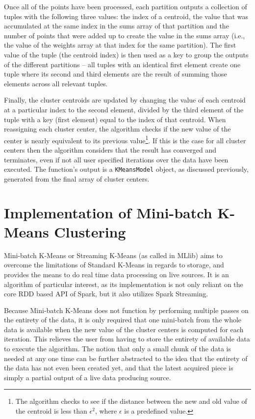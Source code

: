 \documentclass{l4proj}
\begin{document}
Once all of the points have been processed, each partition outputs a collection of tuples with the following three values: the index of a centroid, the value that was accumulated at the same index in the sums array of that partition and the number of points that were added up to create the value in the sums array (i.e., the value of the weights array at that index for the same partition). The first value of the tuple (the centroid index) is then used as a key to group the outputs of the different partitions -- all tuples with an identical first element create one tuple where its second and third elements are the result of summing those elements across all relevant tuples.

Finally, the cluster centroids are updated by changing the value of each centroid at a particular index to the second element, divided by the third element of the tuple with a key (first element) equal to the index of that centroid. When reassigning each cluster center, the algorithm checks if the new value of the center is nearly equivalent to its previous value\footnote{The algorithm checks to see if the distance between the new and old value of the centroid is less than $\epsilon^2$, where $\epsilon$ is a predefined value.}.  If this is the case for all cluster centers then the algorithm considers that the result has converged and terminates, even if not all user specified iterations over the data have been executed. The function's output is a \texttt{KMeansModel} object, as discussed previously, generated from the final array of cluster centers.

\section{Implementation of Mini-batch K-Means Clustering}

Mini-batch K-Means or Streaming K-Means (as called in MLlib) aims to overcome the limitations of Standard K-Means in regards to storage, and provides the means to do real time data processing on live sources. It is an algorithm of particular interest, as its implementation is not only reliant on the core RDD based API of Spark, but it also utilizes Spark Streaming.

Because Mini-batch K-Means does not function by performing multiple passes on the entirety of the data, it is only required that one mini-batch from the whole data is available when the new value of the cluster centers is computed for each iteration. This relieves the user from having to store the entirety of available data to execute the algorithm. The notion that only a small chunk of the data is needed at any one time can be further abstracted to the idea that the entirety of the data has not even been created yet, and that the latest acquired piece is simply a partial output of a live data producing source.
\end{document}
